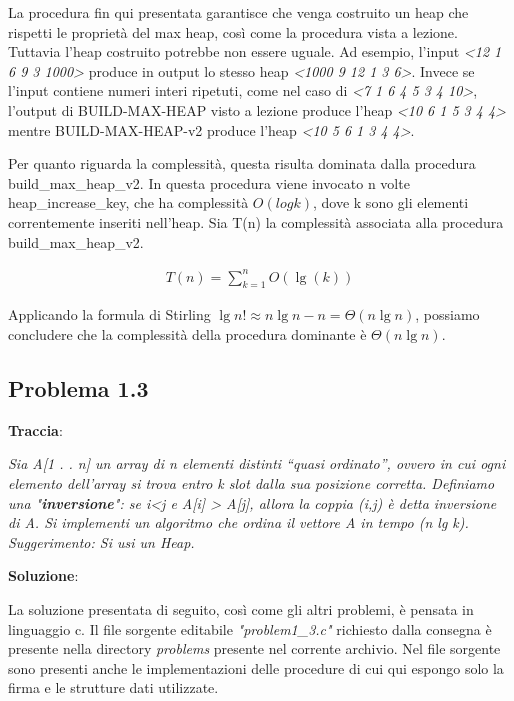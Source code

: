 \documentclass{article}
\begin{document}
\noindent
La procedura fin qui presentata garantisce che venga costruito un heap che rispetti le proprietà del max heap, così come la procedura vista a lezione. Tuttavia l'heap costruito potrebbe non essere uguale. Ad esempio, l'input \textit{<12 1 6 9 3 1000>} produce in output lo stesso heap \textit{<1000 9 12 1 3 6>}. Invece se l'input contiene numeri interi ripetuti, come nel caso di \textit{<7 1 6 4 5 3 4 10>}, l'output di BUILD-MAX-HEAP visto a lezione produce l'heap \textit{<10 6 1 5 3 4 4>} mentre BUILD-MAX-HEAP-v2 produce l'heap \textit{<10 5 6 1 3 4 4>}.

\noindent
Per quanto riguarda la complessità, questa risulta dominata dalla procedura build\_max\_heap\_v2. In questa procedura viene invocato n volte heap\_increase\_key, che ha complessità $O(log k)$, dove k sono gli elementi correntemente inseriti nell'heap. Sia T(n) la complessità associata alla procedura build\_max\_heap\_v2. 


\begin{equation} \label{eq:problem1_2}
\begin{aligned}
T(n) = \sum_{k=1}^{n} O(\lg(k))
\end{aligned}
\end{equation}

\noindent
Applicando la formula di Stirling $\lg{n!} \approx n \lg{n} - n = \Theta(n\lg{n})$, possiamo concludere che la complessità della procedura dominante è $\Theta(n\lg{n})$.



\subsection{Problema 1.3} \label{subsec:problema_1_3}
\textbf{Traccia}:

\noindent
\textit{Sia A[1 . . n] un array di n elementi distinti “quasi ordinato”, ovvero in cui ogni elemento dell'array si trova entro k slot dalla sua posizione corretta. Definiamo una "\textbf{inversione}": se i<j e A[i] > A[j], allora la coppia (i,j) è detta inversione di A. Si implementi un algoritmo che ordina il vettore A in tempo (n lg k). Suggerimento: Si usi un Heap.}

\vspace{2\baselineskip}
\noindent
\textbf{Soluzione}: 

\noindent
La soluzione presentata di seguito, così come gli altri problemi, è pensata in linguaggio c. Il file sorgente editabile \textit{"problem1\_3.c"} richiesto dalla consegna è presente nella directory \textit{problems} presente nel corrente archivio. Nel file sorgente sono presenti anche le implementazioni delle procedure di cui qui espongo solo la firma e le strutture dati utilizzate.
\end{document}

